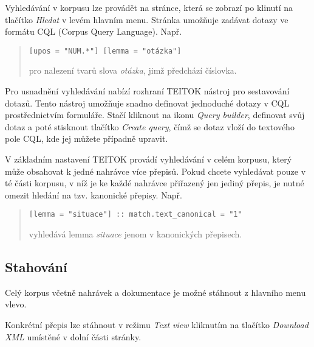 \documentclass[
]{article}
\begin{document}
Vyhledávání v korpusu lze provádět na stránce, která se zobrazí po
klinutí na tlačítko \emph{Hledat} v levém hlavním menu. Stránka umožňuje
zadávat dotazy ve formátu CQL (Corpus Query Language). Např.

\begin{quote}
\texttt{{[}upos\ =\ "NUM.*"{]}\ {[}lemma\ =\ "otázka"{]}}

pro nalezení tvarů slova \emph{otázka}, jimž předchází číslovka.
\end{quote}

Pro usnadnění vyhledávání nabízí rozhraní TEITOK nástroj pro sestavování
dotazů. Tento nástroj umožňuje snadno definovat jednoduché dotazy v CQL
prostřednictvím formuláře. Stačí kliknout na ikonu \emph{Query builder},
definovat svůj dotaz a poté stisknout tlačítko \emph{Create query}, čímž
se dotaz vloží do textového pole CQL, kde jej můžete případně upravit.

V základním nastavení TEITOK provádí vyhledávání v celém korpusu, který
může obsahovat k jedné nahrávce více přepisů. Pokud chcete vyhledávat
pouze v té části korpusu, v níž je ke každé nahrávce přiřazený jen
jediný přepis, je nutné omezit hledání na tzv. kanonické přepisy. Např.

\begin{quote}
\texttt{{[}lemma\ =\ "situace"{]}\ ::\ match.text\_canonical\ =\ "1"}

vyhledává lemma \emph{situace} jenom v kanonických přepisech.
\end{quote}

\hypertarget{stahovuxe1nuxed}{%
\subsection{Stahování}\label{stahovuxe1nuxed}}

Celý korpus včetně nahrávek a dokumentace je možné stáhnout z hlavního
menu vlevo.

Konkrétní přepis lze stáhnout v režimu \emph{Text view} kliknutím na
tlačítko \emph{Download XML} umístěné v dolní části stránky.
\end{document}
